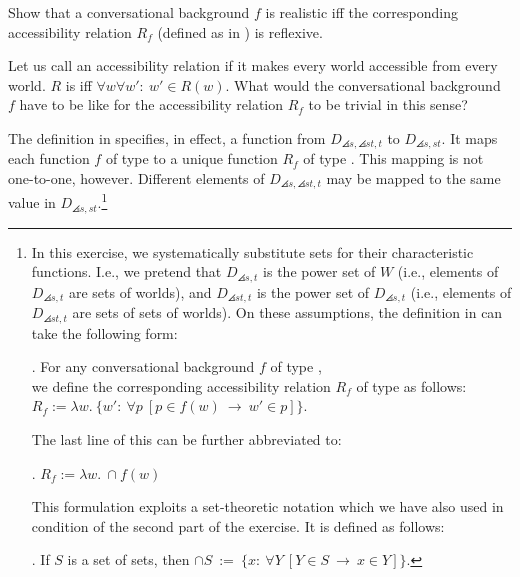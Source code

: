 \begin{exercise}
	
	Show that a conversational background $f$ is realistic iff the corresponding accessibility relation $R_{f}$ (defined as in \Last) is reflexive. \eex 
\end{exercise}

\begin{exercise}
	
	Let us call an accessibility relation  if it makes every world accessible from every world. $R$ is  iff $\forall w\forall w'\!:\ w'\in R(w)$. What would the conversational background $f$ have to be like for the accessibility relation $R_{f}$ to be trivial in this sense? \eex 
\end{exercise}

\begin{exercise}\label{closure}
	
	The definition in \Last specifies, in effect, a function from $D_{\angles{s,\angles{st,t}}}$ to $D_{\angles{s,st}}$. It maps each function $f$ of type  to a unique function $R_{f}$ of type . This mapping is not one-to-one, however. Different elements of $D_{\angles{s,\angles{st,t}}}$ may be mapped to the same value in $D_{\angles{s,st}}$.\footnote{In this exercise, we systematically substitute sets for their characteristic functions. I.e., we pretend that $D_{\angles{s,t}}$ is the power set of $W$ (i.e., elements of $D_{\angles{s,t}}$ are sets of worlds), and $D_{\angles{st,t}}$ is the power set of $D_{\angles{s,t}}$ (i.e., elements of $D_{\angles{st,t}}$ are sets of sets of worlds). On these assumptions, the definition in \Last can take the following form:
	
	\ex. For any conversational background $f$ of type , \\
	we define the corresponding accessibility relation $R_{f}$ of type  as follows:\\
	$R_{f} := \lambda w.\ \{w':\ \forall p\ [p\in f(w)\ \rightarrow\ w'\in p] \}$.
	
	The last line of this can be further abbreviated to:
	
	\ex. $R_{f} := \lambda w.\ \ensuremath{\cap}f(w)$
	
	This formulation exploits a set-theoretic notation which we have also used in condition \TextNext of the second part of the exercise. It is defined as follows:
	
	\ex. If $S$ is a set of sets, then $\ensuremath{\cap}S\ :=\ \{x:\ \forall Y\ [Y\in S\ \rightarrow\ x\in Y]\}$.
	
}
\end{exercise}
